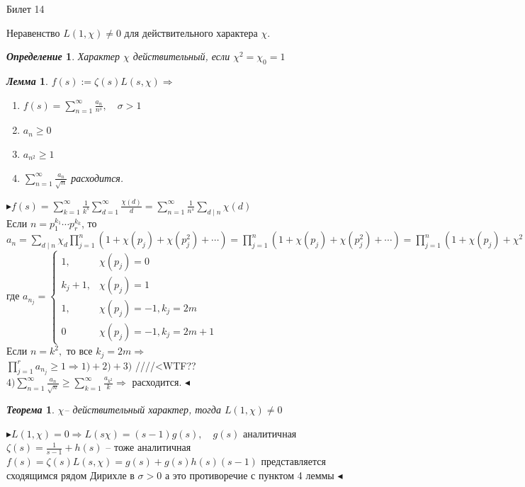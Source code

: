 \documentclass[a4paper,12pt]{article}
\newtheorem{deff}{\textit{Определение}}
\newtheorem{teo}{\textit{Теорема}}
\newtheorem{lem}{\textit{Лемма}}
\newcommand{\q}{\quad}
\newcommand{\pb}{\blacktriangleright}
\newcommand{\pe}{\blacktriangleleft}
\newcommand{\Ra}{\Rightarrow}
\newcommand{\SL}{\sum\limits}
\begin{document}
\newpage
\begin{mybox2}{\hypertarget{bil14}{Билет 14}}

\begin{formbox}{}
Неравенство $L(1,\chi)\not=0$ для действительного характера $\chi$.
\end{formbox}
\begin{formbox}{}
\begin{deff} Характер $\chi$ действительный, если $\chi^2 = \chi_0 = 1$
\end{deff}
\end{formbox}
\begin{formbox}{}
\begin{lem} $f(s):= \zeta(s) L(s,\chi) \Ra$
\begin{enumerate}
\item $f(s) = \SL_{n=1}^\infty \frac{a_n}{n^s},\q\sigma > 1 $
\item $a_n \ge 0$
\item $a_{n^2} \ge 1$
\item $\SL_{n=1}^\infty \frac{a_n}{\sqrt{n}} $ расходится.
\end{enumerate}
\end{lem}
\end{formbox}
$\pb f(s) = \SL_{k=1}^\infty \frac{1}{k^s}  \SL_{d=1}^\infty \frac{\chi(d)}{d} = \SL_{n=1}^\infty \frac{1}{n^s} \SL_{d\mid n}\chi(d)$\\
Если $n = p_1^{k_1}\cdots p_r^{k_k}$, то $a_n = \SL_{d\mid n}\chi_d  \prod\limits_{j=1}^n (1 + \chi(p_j) + \chi(p_j^2) + \cdots)  = \prod\limits_{j=1}^n (1 + \chi(p_j) + \chi(p_j^2) + \cdots) =  \prod\limits_{j=1}^n (1 + \chi(p_j) + \chi^2(p_j) + \cdots)$\\
где $a_{n_j} = \begin{cases} 1, &\chi(p_j) = 0\\k_j + 1, &\chi(p_j)=1\\1, &\chi(p_j) = -1, k_j=2m\\0 &\chi(p_j) = -1, k_j=2m+1 \end{cases}$\\
Если $n = k^2,$ то все $k_j=2m\Ra$\\
$\prod\limits_{j=1}^r  a_{n_j} \ge 1 \Ra 1)+2)+3)$ ////<WTF??\\
$4) \SL_{n=1}^\infty \frac{a_n}{\sqrt{n}} \ge \SL_{k=1}^\infty \frac{a_{k^2}}{k}  \Ra$ расходится. $\pe$

\begin{formbox}{}
\begin{teo} $\chi$-- действительный характер, тогда $L(1, \chi) \not=0$
\end{teo}
\end{formbox}
$\pb L(1,\chi) = 0\Ra L(s\chi) = (s-1)g(s), \q g(s)$ аналитичная\\
$\zeta(s) =\frac{1}{s-1} + h(s) $ -- тоже аналитичная\\
$f(s) = \zeta(s) L(s,\chi) = g(s) + g(s)h(s)(s-1)  $ представляется сходящимся рядом Дирихле в $\sigma > 0$ а это противоречие с пунктом 4 леммы $\pe$ 
\end{mybox2}
\end{document}
